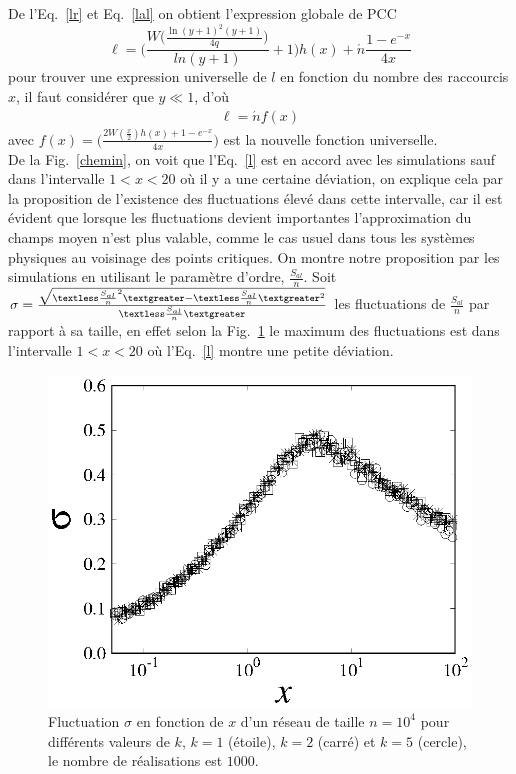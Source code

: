 De l'Eq.~\eqref{lr} et Eq.~\eqref{lal} on obtient l'expression globale de PCC 
\begin{equation}
\ell=\bigg(\frac{W\big(\frac{\ln(y+1)^2(y+1)}{4q}\big)}{ln(y+1)}+1\bigg)h(x)+\acute{n}\frac{1-e^{-x}}{4x}
\label{l}
\end{equation}
pour trouver une expression universelle de $l$ en fonction du nombre des raccourcis $x$, il faut considérer que $y\ll 1$, d'où
\begin{eqnarray}
\ell=\acute{n}f(x) 
\label{l2}
\end{eqnarray}
avec $f(x)=\big(\frac{2W(\frac{x}{2})h(x)+1-e^{-x}}{4x}\big)$ est la nouvelle fonction universelle.\\
De la Fig.~\ref{chemin}, on voit que l'Eq.~\eqref{l} est en accord avec les simulations sauf dans l'intervalle
$1<x<20$  où il y a une certaine déviation, on explique cela par la proposition de l'existence des fluctuations élevé dans cette intervalle, car il est évident que lorsque les fluctuations devient importantes l'approximation du champs moyen n'est plus valable,  comme le cas usuel dans tous les systèmes physiques au voisinage des points critiques. On montre notre proposition par les simulations en utilisant le paramètre
d'ordre, $\frac{S_{al}}{n}$.
Soit $\sigma=\frac{\sqrt{\textless \frac{S_{al}}{n}^2\textgreater-\textless \frac{S_{al}}{n}\textgreater^2}}{\textless \frac{S_{al}}{n}\textgreater}$
les fluctuations de $\frac{S_{al}}{n}$ par rapport à sa taille,  en effet selon la Fig.~\ref{fluct} le maximum des fluctuations
est dans l'intervalle $1<x<20$ où l'Eq.~\eqref{l} montre une petite déviation.\\

\begin{figure}[h!]
	\centering
	\includegraphics[scale=1,angle=0]{./figures/fig-f}
	\caption{Fluctuation $\sigma$ en fonction de $x$ d'un réseau de taille $n=10^4$  pour différents valeurs de $k$, $k=1$ (étoile), $k=2$ (carré) et $k=5$ (cercle), le nombre de réalisations est $1000$.}
	\label{fluct}
\end{figure}


